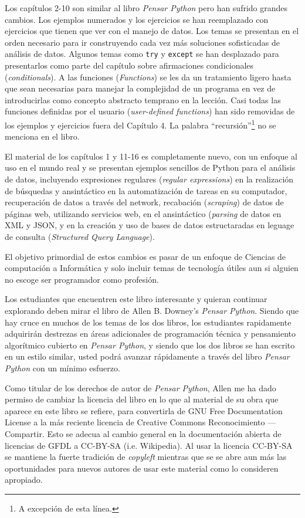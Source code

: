 Los cap\'itulos 2-10 son similar al libro \emph{Pensar Python}
pero han sufrido grandes cambios. Los ejemplos numerados y los ejercicios se han reemplazado con ejercicios que tienen que ver con el manejo de datos. Los temas se presentan en el orden necesario para ir construyendo cada vez m\'as soluciones sofisticadas de an\'alisis de datos. Algunos temas como {\tt try} y
{\tt except} se han desplazado para presentarlos como parte del cap\'itulo sobre afirmaciones condicionales (\textit{conditionals}).  A las funciones (\textit{Functions}) se les da un tratamiento ligero hasta que sean necesarias para manejar la complejidad de un programa en vez de introducirlas como concepto abstracto temprano en la lecci\'on. Casi todas las funciones definidas por el usuario (\textit{user-defined functions}) han sido removidas de los ejemplos y ejercicios fuera del Cap\'itulo 4. La palabra ``recursi\'on''\footnote{A excepci\'on de esta l\'inea.} no se menciona en el libro.

El material de los cap\'itulos 1 y 11-16 es completamente nuevo, con un enfoque al uso en el mundo real y se presentan ejemplos sencillos de Python para el an\'alisis de datos, incluyendo expresiones regulares (\textit{regular expressions}) en la realizaci\'on de b\'usquedas y an\alisis sint\'actico en la automatizaci\'on de tareas en su computador, recuperaci\'on de datos a trav\'es del network, recabaci\'on (\textit{scraping}) de datos de p\'aginas web, utilizando servicios web, en el an\alisis sint\'actico (\textit{parsing} de datos en XML y JSON, y en la creaci\'on y uso de bases de datos estructaradas en leguage de consulta (\textit{Structured Query Language}).

El objetivo primordial de estos cambios es pasar de un enfoque de Ciencias de computaci\'on a Inform\'atica y solo incluir temas de tecnolog\'ia \'utiles aun si alguien no escoge ser programador como profesi\'on.

Los estudiantes que encuentren este libro interesante y quieran continuar explorando deben mirar el libro de Allen B. Downey's \emph{Pensar Python}. Siendo que hay cruce en muchos de los temas de los dos libros,
los estudiantes rapidamente adquirir\'an destrezas en \'areas adicionales de programaci\'on t\'ecnica y pensamiento algor\'itmico cubierto en \emph{Pensar Python}, y siendo que los dos libros se han escrito en un estilo similar, usted podr\'a avanzar r\'apidamente a trav\'es del libro \emph{Pensar Python} con un m\'inimo esfuerzo.

Como titular de los derechos de autor de \emph{Pensar Python},
Allen me ha dado permiso de cambiar la licencia del libro en lo que al material de su obra que aparece en este libro se refiere, para convertirla de GNU Free Documentation License 
a la m\'as reciente licencia de Creative Commons Reconocimiento --- Compartir. Esto se adecua al cambio general en la documentaci\'on abierta de licencias de GFDL a CC-BY-SA (i.e. Wikipedia).
Al usar la licencia CC-BY-SA se mantiene la fuerte tradici\'on de \textit{copyleft} mientras  que se se abre aun m\'as las oportunidades para nuevos autores de usar este material como lo consideren apropiado.

